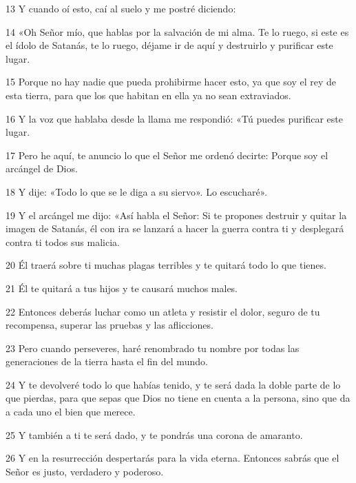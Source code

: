 \par 13 Y cuando oí esto, caí al suelo y me postré diciendo:

\par 14 «Oh Señor mío, que hablas por la salvación de mi alma. Te lo ruego, si este es el ídolo de Satanás, te lo ruego, déjame ir de aquí y destruirlo y purificar este lugar.

\par 15 Porque no hay nadie que pueda prohibirme hacer esto, ya que soy el rey de esta tierra, para que los que habitan en ella ya no sean extraviados.

\par 16 Y la voz que hablaba desde la llama me respondió: «Tú puedes purificar este lugar.

\par 17 Pero he aquí, te anuncio lo que el Señor me ordenó decirte: Porque soy el arcángel de Dios.

\par 18 Y dije: «Todo lo que se le diga a su siervo». Lo escucharé».

\par 19 Y el arcángel me dijo: «Así habla el Señor: Si te propones destruir y quitar la imagen de Satanás, él con ira se lanzará a hacer la guerra contra ti y desplegará contra ti todos sus malicia.

\par 20 Él traerá sobre ti muchas plagas terribles y te quitará todo lo que tienes.

\par 21 Él te quitará a tus hijos y te causará muchos males.

\par 22 Entonces deberás luchar como un atleta y resistir el dolor, seguro de tu recompensa, superar las pruebas y las aflicciones.

\par 23 Pero cuando perseveres, haré renombrado tu nombre por todas las generaciones de la tierra hasta el fin del mundo.

\par 24 Y te devolveré todo lo que habías tenido, y te será dada la doble parte de lo que pierdas, para que sepas que Dios no tiene en cuenta a la persona, sino que da a cada uno el bien que merece.

\par 25 Y también a ti te será dado, y te pondrás una corona de amaranto.

\par 26 Y en la resurrección despertarás para la vida eterna. Entonces sabrás que el Señor es justo, verdadero y poderoso.

